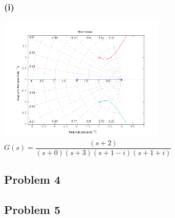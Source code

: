 \documentclass[letterpaper,10pt]{article}
\begin{document}
\subsubsection*{(i)}
\begin{center}
    \includegraphics[width=0.6\textwidth]{homework04-7-1-i.png} \\
   $G(s) = \dfrac{(s+2)}{(s+0)(s+3)(s+1-i)(s+1+i)}$
\end{center}

\subsection*{Problem 4}

\subsection*{Problem 5}
\end{document}
